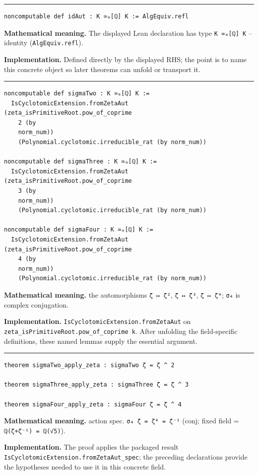 \documentclass[UTF8,a4paper,11pt,fontset=fandol]{ctexart}
\theoremstyle{definition}
\newcommand{\statementsep}{\par\medskip\hrule\medskip}
\begin{document}
\statementsep
\begin{verbatim}
noncomputable def idAut : K ≃ₐ[ℚ] K := AlgEquiv.refl
\end{verbatim}
\noindent\textbf{Mathematical meaning.} The displayed Lean declaration has type \texttt{K ≃ₐ[ℚ] K} -- identity (\texttt{AlgEquiv.\allowbreak{}refl}).\par
\noindent\textbf{Implementation.} Defined directly by the displayed RHS; the point is to name this concrete object so later theorems can unfold or transport it.\par
\statementsep
\begin{verbatim}
noncomputable def sigmaTwo : K ≃ₐ[ℚ] K :=
  IsCyclotomicExtension.fromZetaAut (zeta_isPrimitiveRoot.pow_of_coprime
    2 (by
    norm_num))
    (Polynomial.cyclotomic.irreducible_rat (by norm_num))

noncomputable def sigmaThree : K ≃ₐ[ℚ] K :=
  IsCyclotomicExtension.fromZetaAut (zeta_isPrimitiveRoot.pow_of_coprime
    3 (by
    norm_num))
    (Polynomial.cyclotomic.irreducible_rat (by norm_num))

noncomputable def sigmaFour : K ≃ₐ[ℚ] K :=
  IsCyclotomicExtension.fromZetaAut (zeta_isPrimitiveRoot.pow_of_coprime
    4 (by
    norm_num))
    (Polynomial.cyclotomic.irreducible_rat (by norm_num))
\end{verbatim}
\noindent\textbf{Mathematical meaning.} the automorphisms \texttt{ζ ↦ ζ²}, \texttt{ζ ↦ ζ³}, \texttt{ζ ↦ ζ⁴}; \texttt{σ₄} is complex conjugation.\par
\noindent\textbf{Implementation.} \texttt{IsCyclotomicExtension.\allowbreak{}fromZetaAut} on \texttt{zeta\_\allowbreak{}isPrimitiveRoot.\allowbreak{}pow\_\allowbreak{}of\_\allowbreak{}coprime k}. After unfolding the field-specific definitions, these named lemmas supply the essential argument.\par
\statementsep
\begin{verbatim}
theorem sigmaTwo_apply_zeta : sigmaTwo ζ = ζ ^ 2

theorem sigmaThree_apply_zeta : sigmaThree ζ = ζ ^ 3

theorem sigmaFour_apply_zeta : sigmaFour ζ = ζ ^ 4
\end{verbatim}
\noindent\textbf{Mathematical meaning.} action spec. \texttt{σ₄ ζ = ζ⁴ = ζ⁻¹} (conj; fixed field = \texttt{ℚ(ζ+ζ⁻¹) = ℚ(√5)}).\par
\noindent\textbf{Implementation.} The proof applies the packaged result \texttt{IsCyclotomicExtension.\allowbreak{}fromZetaAut\_\allowbreak{}spec}; the preceding declarations provide the hypotheses needed to use it in this concrete field.\par
\end{document}
